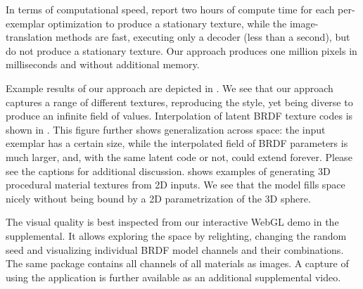 \documentclass[acmtog, review, anonymous]{acmart}
\begin{document}
In terms of computational speed, \citet{aittala2016reflectance} report two hours of compute time for each per-exemplar optimization to produce a stationary texture, while the image-translation methods are fast, executing only a decoder (less than a second), but do not produce a stationary texture.
Our approach produces one million pixels in milliseconds and without additional memory.



Example results of our approach are depicted in .
We see that our approach captures a range of different textures, reproducing the style, yet being diverse to produce an infinite field of values.
Interpolation of latent BRDF texture codes is shown in .
This figure further shows generalization across space: the input exemplar has a certain size, while the interpolated field of BRDF parameters is much larger, and, with the same latent code or not, could extend forever.
Please see the captions for additional discussion.
 shows examples of generating 3D procedural material textures from 2D inputs.
We see that the model fills space nicely without being bound by a 2D parametrization of the 3D sphere.

The visual quality is best inspected from our interactive WebGL demo in the supplemental.
It allows exploring the space by relighting, changing the random seed and visualizing individual BRDF model channels and their combinations.
The same package contains all channels of all materials as images.
A capture of using the application is further available as an additional supplemental video.


\end{document}
